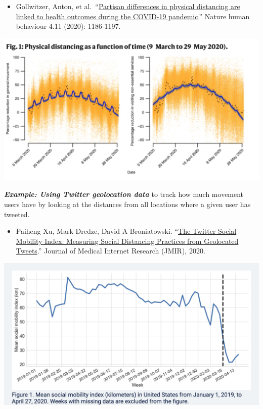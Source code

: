 \documentclass[
  letterpaper,
  DIV=11,
  numbers=noendperiod]{scrreprt}
\providecommand{\tightlist}{%
  \setlength{\itemsep}{0pt}\setlength{\parskip}{0pt}}\usepackage{longtable,booktabs,array}
\begin{document}
\begin{itemize}
\tightlist
\item
  Gollwitzer, Anton, et
  al.~``\href{https://www.nature.com/articles/s41562-020-00977-7}{Partisan
  differences in physical distancing are linked to health outcomes
  during the COVID-19 pandemic}.'' Nature human behaviour 4.11 (2020):
  1186-1197.
\end{itemize}

\includegraphics{images/covidphone.png}

\textbf{\emph{Example: Using Twitter geolocation data}} to track how
much movement users have by looking at the distances from all locations
where a given user has tweeted.

\begin{itemize}
\tightlist
\item
  Paiheng Xu, Mark Dredze, David A Broniatowski.
  ``\href{https://socialmobility.covid19dataresources.org/}{The Twitter
  Social Mobility Index: Measuring Social Distancing Practices from
  Geolocated Tweets}.'' Journal of Medical Internet Research (JMIR),
  2020.
\end{itemize}

\includegraphics{images/covidtwitter.png}
\end{document}
